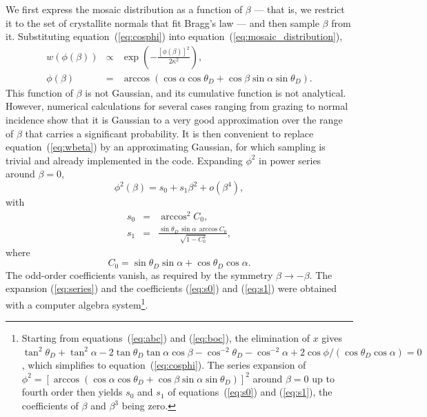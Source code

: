 \documentclass{iucr}
\begin{document}
We first express the mosaic
distribution as a function of $\beta$ --- that is, we restrict it to the set of
crystallite normals that fit Bragg's law --- and then sample $\beta$ from it.
Substituting equation~(\ref{eq:cosphi}) into
equation~(\ref{eq:mosaic_distribution}),
\begin{eqnarray}
w\left( \phi(\beta) \right) &\propto& \exp\left( -\frac{[\phi(\beta)]^2}{2\kappa^2} \right) ,
\label{eq:wbeta} \\
\phi(\beta) &=& \arccos\left( \cos\alpha \cos\theta_D + \cos\beta \sin\alpha \sin\theta_D \right) .
\nonumber
\end{eqnarray}
This function of $\beta$ is not Gaussian, and its cumulative function is not
analytical. However, numerical calculations for several cases ranging from grazing
to normal incidence show that it is Gaussian to a very good approximation over the
range of $\beta$ that carries a significant probability. It is then convenient to
replace equation~(\ref{eq:wbeta}) by an approximating Gaussian, for which sampling
is trivial and already implemented in the code. Expanding $\phi^2$ in power series
around $\beta = 0$,
\begin{equation}
\phi^2(\beta) = s_0 + s_1 \beta^2 + o(\beta^4) ,
\label{eq:series}
\end{equation}
with
\begin{eqnarray}
s_0 &=& \arccos^2 C_0 ,
\label{eq:s0} \\
s_1 &=& \frac{\sin\theta_D \, \sin\alpha \, \arccos C_0}{\sqrt{1 - C_0^2}} ,
\label{eq:s1}
\end{eqnarray}
where
\begin{equation}
C_0 = \sin\theta_D \sin\alpha + \cos\theta_D \cos\alpha .
\label{eq:C0}
\end{equation}
The odd-order coefficients vanish, as required by the symmetry
$\beta \rightarrow -\beta$. The expansion (\ref{eq:series}) and the coefficients
(\ref{eq:s0}) and (\ref{eq:s1}) were obtained with a computer algebra
system\footnote{Starting from equations~(\ref{eq:abc}) and (\ref{eq:boc}), the
elimination of $x$ gives $\tan^2\theta_D + \tan^2\alpha - 2\tan\theta_D \tan\alpha
\cos\beta - \cos^{-2}\theta_D - \cos^{-2}\alpha + 2\cos\phi/(\cos\theta_D
\cos\alpha) = 0$, which simplifies to equation~(\ref{eq:cosphi}). The series
expansion of $\phi^2 = [\arccos(\cos\alpha\cos\theta_D +
\cos\beta\sin\alpha\sin\theta_D)]^2$ around $\beta = 0$ up to fourth order then
yields $s_0$ and $s_1$ of equations~(\ref{eq:s0}) and (\ref{eq:s1}), the
coefficients of $\beta$ and $\beta^3$ being zero.}.
\end{document}
